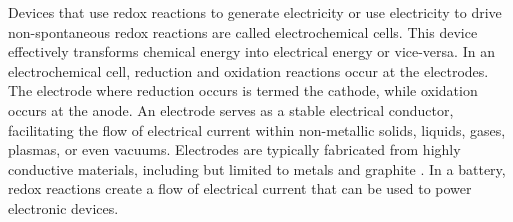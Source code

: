 Devices that use redox reactions to generate electricity or use electricity to drive non-spontaneous redox reactions are called electrochemical cells. This device effectively transforms chemical energy into electrical energy or vice-versa. In an electrochemical cell, reduction and oxidation reactions occur at the electrodes. The electrode where reduction occurs is termed the cathode, while oxidation occurs at the anode. An electrode serves as a stable electrical conductor, facilitating the flow of electrical current within non-metallic solids, liquids, gases, plasmas, or even vacuums. Electrodes are typically fabricated from highly conductive materials, including but limited to metals and graphite \cite{goldbook}. In a battery, redox reactions create a flow of electrical current that can be used to power electronic devices.

